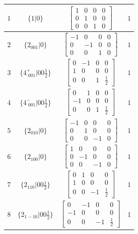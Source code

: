 \documentclass[fleqn,8pt]{jsarticle}
\begin{document}
\begin{longtable}{cccc}
$ 1 $ & $ \{1|0\} $ & $ \begin{bmatrix} 1 & 0 & 0 & 0 \\ 0 & 1 & 0 & 0 \\ 0 & 0 & 1 & 0 \end{bmatrix} $ & $ 1 $ \\ \hline
$ 2 $ & $ \{2{}_{001}|0\} $ & $ \begin{bmatrix} -1 & 0 & 0 & 0 \\ 0 & -1 & 0 & 0 \\ 0 & 0 & 1 & 0 \end{bmatrix} $ & $ 1 $ \\ \hline
$ 3 $ & $ \{4^{+}_{\,\,001}|0 0 \frac{1}{2}\} $ & $ \begin{bmatrix} 0 & -1 & 0 & 0 \\ 1 & 0 & 0 & 0 \\ 0 & 0 & 1 & \frac{1}{2} \end{bmatrix} $ & $ 1 $ \\ \hline
$ 4 $ & $ \{4^{-}_{\,\,001}|0 0 \frac{1}{2}\} $ & $ \begin{bmatrix} 0 & 1 & 0 & 0 \\ -1 & 0 & 0 & 0 \\ 0 & 0 & 1 & \frac{1}{2} \end{bmatrix} $ & $ 1 $ \\ \hline
$ 5 $ & $ \{2{}_{010}|0\} $ & $ \begin{bmatrix} -1 & 0 & 0 & 0 \\ 0 & 1 & 0 & 0 \\ 0 & 0 & -1 & 0 \end{bmatrix} $ & $ 1 $ \\ \hline
$ 6 $ & $ \{2{}_{100}|0\} $ & $ \begin{bmatrix} 1 & 0 & 0 & 0 \\ 0 & -1 & 0 & 0 \\ 0 & 0 & -1 & 0 \end{bmatrix} $ & $ 1 $ \\ \hline
$ 7 $ & $ \{2{}_{110}|0 0 \frac{1}{2}\} $ & $ \begin{bmatrix} 0 & 1 & 0 & 0 \\ 1 & 0 & 0 & 0 \\ 0 & 0 & -1 & \frac{1}{2} \end{bmatrix} $ & $ 1 $ \\ \hline
$ 8 $ & $ \{2{}_{1-10}|0 0 \frac{1}{2}\} $ & $ \begin{bmatrix} 0 & -1 & 0 & 0 \\ -1 & 0 & 0 & 0 \\ 0 & 0 & -1 & \frac{1}{2} \end{bmatrix} $ & $ 1 $ \\
\end{longtable}
\end{document}
